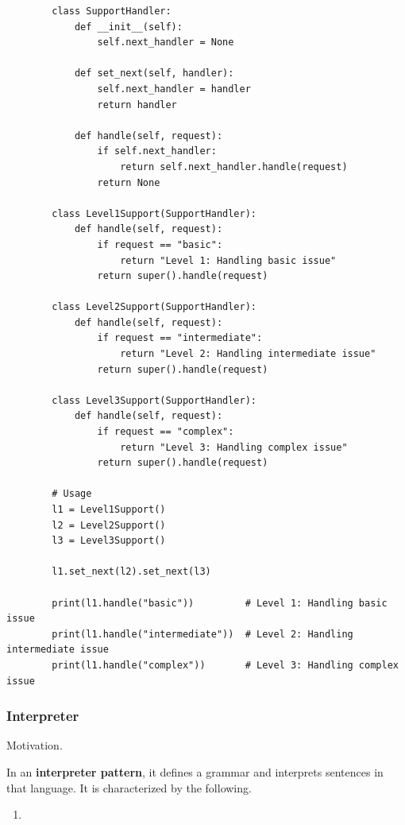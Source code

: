     \begin{example}
      \label{ex:case-study-9}
      \begin{lstlisting}
        class SupportHandler:
            def __init__(self):
                self.next_handler = None
            
            def set_next(self, handler):
                self.next_handler = handler
                return handler
            
            def handle(self, request):
                if self.next_handler:
                    return self.next_handler.handle(request)
                return None

        class Level1Support(SupportHandler):
            def handle(self, request):
                if request == "basic":
                    return "Level 1: Handling basic issue"
                return super().handle(request)

        class Level2Support(SupportHandler):
            def handle(self, request):
                if request == "intermediate":
                    return "Level 2: Handling intermediate issue"
                return super().handle(request)

        class Level3Support(SupportHandler):
            def handle(self, request):
                if request == "complex":
                    return "Level 3: Handling complex issue"
                return super().handle(request)

        # Usage
        l1 = Level1Support()
        l2 = Level2Support()
        l3 = Level3Support()

        l1.set_next(l2).set_next(l3)

        print(l1.handle("basic"))         # Level 1: Handling basic issue
        print(l1.handle("intermediate"))  # Level 2: Handling intermediate issue
        print(l1.handle("complex"))       # Level 3: Handling complex issue 
      \end{lstlisting}
    \end{example}

  \subsubsection{Interpreter}

    Motivation. 

    \begin{definition}
      \label{def:interpreter-pattern}
      In an \textbf{interpreter pattern}, it defines a grammar and interprets sentences in that language. It is characterized by the following. 
      \begin{enumerate}
        \item 
      \end{enumerate}
    \end{definition}

